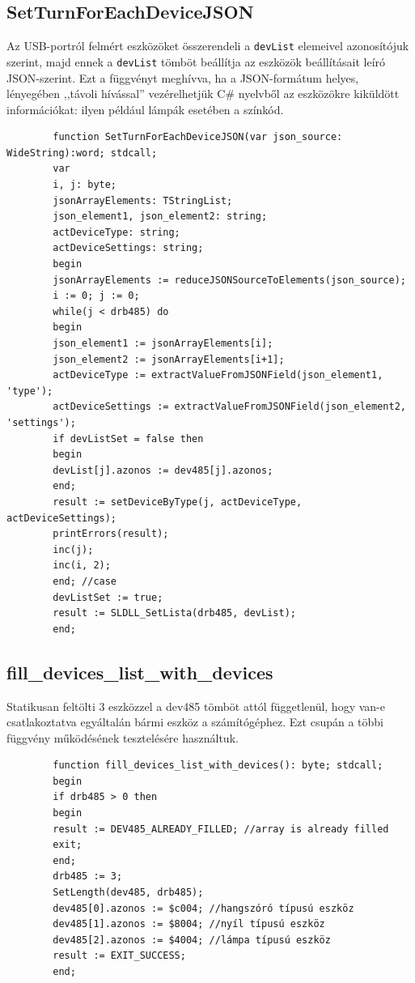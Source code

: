 \documentclass[tocnopagenum]{thesis-ekf}
\theoremstyle{definition}
\theoremstyle{remark}
\begin{document}
	\subsection{SetTurnForEachDeviceJSON} 
	Az USB-portról felmért eszközöket összerendeli a \verb*|devList| elemeivel azonosítójuk szerint, majd ennek a \verb*|devList| tömböt beállítja az eszközök beállításait leíró JSON-szerint. Ezt a függvényt meghívva, ha a JSON-formátum helyes, lényegében ,,távoli hívással'' vezérelhetjük C\# nyelvből az eszközökre kiküldött információkat: ilyen például lámpák esetében a színkód.
	
	\begin{verbatim}
		function SetTurnForEachDeviceJSON(var json_source: WideString):word; stdcall;
		var
		i, j: byte;
		jsonArrayElements: TStringList;
		json_element1, json_element2: string;
		actDeviceType: string;
		actDeviceSettings: string;
		begin
		jsonArrayElements := reduceJSONSourceToElements(json_source);
		i := 0; j := 0;
		while(j < drb485) do
		begin
		json_element1 := jsonArrayElements[i];
		json_element2 := jsonArrayElements[i+1];
		actDeviceType := extractValueFromJSONField(json_element1, 'type'); 
		actDeviceSettings := extractValueFromJSONField(json_element2, 'settings');
		if devListSet = false then 
		begin
		devList[j].azonos := dev485[j].azonos; 
		end;
		result := setDeviceByType(j, actDeviceType, actDeviceSettings);
		printErrors(result);
		inc(j);
		inc(i, 2);
		end; //case
		devListSet := true;
		result := SLDLL_SetLista(drb485, devList);
		end;
	\end{verbatim}
	
	\subsection{fill\_devices\_list\_with\_devices} Statikusan feltölti 3 eszközzel a dev485 tömböt attól függetlenül, hogy van-e csatlakoztatva egyáltalán bármi eszköz a számítógéphez. Ezt csupán a többi függvény működésének tesztelésére használtuk.
	
	\begin{verbatim}
		function fill_devices_list_with_devices(): byte; stdcall;
		begin
		if drb485 > 0 then
		begin
		result := DEV485_ALREADY_FILLED; //array is already filled
		exit;
		end;
		drb485 := 3;
		SetLength(dev485, drb485);
		dev485[0].azonos := $c004; //hangszóró típusú eszköz
		dev485[1].azonos := $8004; //nyíl típusú eszköz
		dev485[2].azonos := $4004; //lámpa típusú eszköz
		result := EXIT_SUCCESS;
		end;
	\end{verbatim}
	
\end{document}
